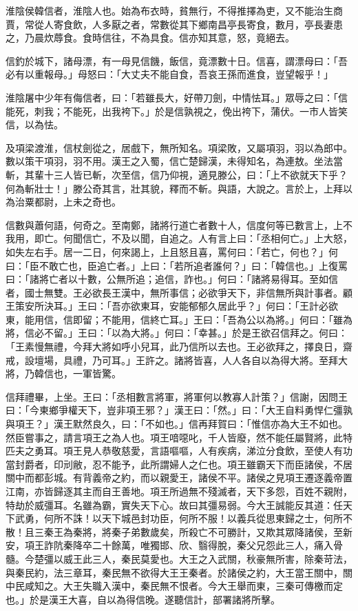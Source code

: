 
\begin{pinyinscope}
淮陰侯韓信者，淮陰人也。始為布衣時，貧無行，不得推擇為吏，又不能治生商賈，常從人寄食飲，人多厭之者，常數從其下鄉南昌亭長寄食，數月，亭長妻患之，乃晨炊蓐食。食時信往，不為具食。信亦知其意，怒，竟絕去。

信釣於城下，諸母漂，有一母見信饑，飯信，竟漂數十日。信喜，謂漂母曰：「吾必有以重報母。」母怒曰：「大丈夫不能自食，吾哀王孫而進食，豈望報乎！」

淮陰屠中少年有侮信者，曰：「若雖長大，好帶刀劍，中情怯耳。」眾辱之曰：「信能死，刺我；不能死，出我袴下。」於是信孰視之，俛出袴下，蒲伏。一市人皆笑信，以為怯。

及項梁渡淮，信杖劍從之，居戲下，無所知名。項梁敗，又屬項羽，羽以為郎中。數以策干項羽，羽不用。漢王之入蜀，信亡楚歸漢，未得知名，為連敖。坐法當斬，其輩十三人皆已斬，次至信，信乃仰視，適見滕公，曰：「上不欲就天下乎？何為斬壯士！」滕公奇其言，壯其貌，釋而不斬。與語，大說之。言於上，上拜以為治粟都尉，上未之奇也。

信數與蕭何語，何奇之。至南鄭，諸將行道亡者數十人，信度何等已數言上，上不我用，即亡。何聞信亡，不及以聞，自追之。人有言上曰：「丞相何亡。」上大怒，如失左右手。居一二日，何來謁上，上且怒且喜，罵何曰：「若亡，何也？」何曰：「臣不敢亡也，臣追亡者。」上曰：「若所追者誰何？」曰：「韓信也。」上復罵曰：「諸將亡者以十數，公無所追；追信，詐也。」何曰：「諸將易得耳。至如信者，國士無雙。王必欲長王漢中，無所事信；必欲爭天下，非信無所與計事者。顧王策安所決耳。」王曰：「吾亦欲東耳，安能郁郁久居此乎？」何曰：「王計必欲東，能用信，信即留；不能用，信終亡耳。」王曰：「吾為公以為將。」何曰：「雖為將，信必不留。」王曰：「以為大將。」何曰：「幸甚。」於是王欲召信拜之。何曰：「王素慢無禮，今拜大將如呼小兒耳，此乃信所以去也。王必欲拜之，擇良日，齋戒，設壇場，具禮，乃可耳。」王許之。諸將皆喜，人人各自以為得大將。至拜大將，乃韓信也，一軍皆驚。

信拜禮畢，上坐。王曰：「丞相數言將軍，將軍何以教寡人計策？」信謝，因問王曰：「今東鄉爭權天下，豈非項王邪？」漢王曰：「然。」曰：「大王自料勇悍仁彊孰與項王？」漢王默然良久，曰：「不如也。」信再拜賀曰：「惟信亦為大王不如也。然臣嘗事之，請言項王之為人也。項王喑噁叱，千人皆廢，然不能任屬賢將，此特匹夫之勇耳。項王見人恭敬慈愛，言語嘔嘔，人有疾病，涕泣分食飲，至使人有功當封爵者，印刓敝，忍不能予，此所謂婦人之仁也。項王雖霸天下而臣諸侯，不居關中而都彭城。有背義帝之約，而以親愛王，諸侯不平。諸侯之見項王遷逐義帝置江南，亦皆歸逐其主而自王善地。項王所過無不殘滅者，天下多怨，百姓不親附，特劫於威彊耳。名雖為霸，實失天下心。故曰其彊易弱。今大王誠能反其道：任天下武勇，何所不誅！以天下城邑封功臣，何所不服！以義兵從思東歸之士，何所不散！且三秦王為秦將，將秦子弟數歲矣，所殺亡不可勝計，又欺其眾降諸侯，至新安，項王詐阬秦降卒二十餘萬，唯獨邯、欣、翳得脫，秦父兄怨此三人，痛入骨髓。今楚彊以威王此三人，秦民莫愛也。大王之入武關，秋豪無所害，除秦苛法，與秦民約，法三章耳，秦民無不欲得大王王秦者。於諸侯之約，大王當王關中，關中民咸知之。大王失職入漢中，秦民無不恨者。今大王舉而東，三秦可傳檄而定也。」於是漢王大喜，自以為得信晚。遂聽信計，部署諸將所擊。


\end{pinyinscope}
